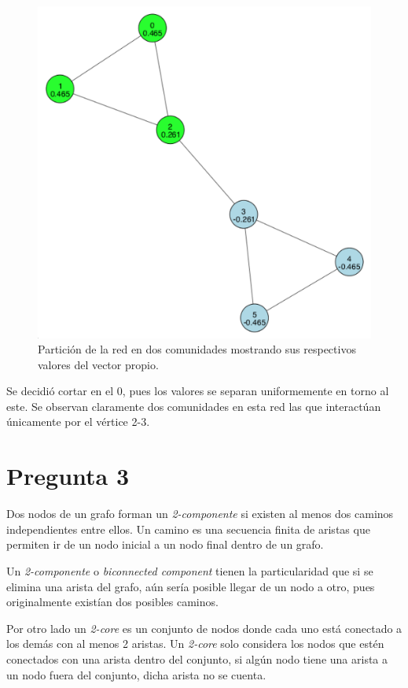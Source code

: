 \documentclass[letterpaper]{article}
\begin{document}
\begin{figure}[H]
  \centering
  \includegraphics[width=.7\linewidth]{img/p2.png}
  \caption{Partición de la red en dos comunidades mostrando sus respectivos valores del vector propio.}
  \label{red:2}
\end{figure}

Se decidió cortar en el 0, pues los valores se separan uniformemente en torno al este. Se observan claramente dos comunidades en esta red las que interactúan únicamente por el vértice 2-3.





\section{Pregunta 3}
Dos nodos de un grafo forman un \textit{2-componente} si existen al menos dos caminos independientes entre ellos. Un camino es una secuencia finita de aristas que permiten ir de un nodo inicial a un nodo final dentro de un grafo.

Un \textit{2-componente} o \textit{biconnected component} tienen la particularidad que si se elimina una arista del grafo, aún sería posible llegar de un nodo a otro, pues originalmente existían dos posibles caminos.

Por otro lado un \textit{2-core} es un conjunto de nodos donde cada uno está conectado a los demás con al menos 2 aristas. Un \textit{2-core} solo considera los nodos que estén conectados con una arista dentro del conjunto, si algún nodo tiene una arista a un nodo fuera del conjunto, dicha arista no se cuenta.
\end{document}
